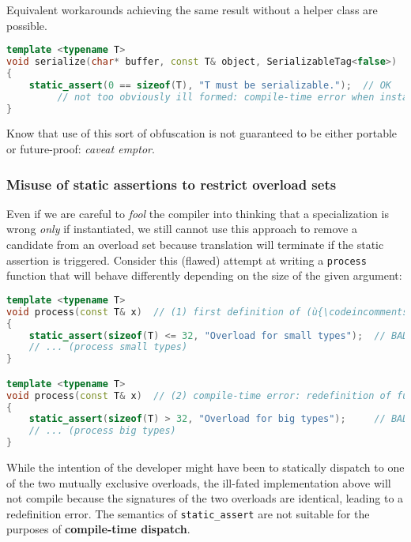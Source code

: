 Equivalent workarounds achieving the same result without a
helper class are possible.

\begin{lstlisting}[language=C++]
template <typename T>
void serialize(char* buffer, const T& object, SerializableTag<false>)  // (2)
{
    static_assert(0 == sizeof(T), "T must be serializable.");  // OK
         // not too obviously ill formed: compile-time error when instantiated
}
\end{lstlisting}
    
\noindent Know that use of this sort of obfuscation is not guaranteed to be either
portable or future-proof: \emph{caveat emptor}.

\subsubsection[Misuse of static assertions to restrict overload sets]{Misuse of static assertions to restrict overload sets}\label{misuse-of-static-assertions-to-restrict-overload-sets}

Even if we are careful to \emph{fool} the compiler into thinking that a
specialization is wrong \emph{only} if instantiated, we still cannot use
this approach to remove a candidate from an overload set because translation
will terminate if the static assertion is triggered. Consider this
(flawed) attempt at writing a \texttt{process} function that will behave
differently depending on the size of the given argument:

\begin{lstlisting}[language=C++]
template <typename T>
void process(const T& x)  // (1) first definition of (ù{\codeincomments{process}}ù) function
{
    static_assert(sizeof(T) <= 32, "Overload for small types");  // BAD IDEA
    // ... (process small types)
}

template <typename T>
void process(const T& x)  // (2) compile-time error: redefinition of function
{
    static_assert(sizeof(T) > 32, "Overload for big types");     // BAD IDEA
    // ... (process big types)
}
\end{lstlisting}
    
\noindent While the intention of the developer might have been to statically
dispatch to one of the two mutually exclusive overloads, the ill-fated
implementation above will not compile because the signatures of the two
overloads are identical, leading to a redefinition error. The semantics
of \texttt{static\_assert} are not suitable for the purposes of
\textbf{compile-time dispatch}. 

